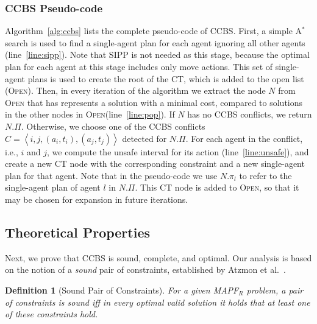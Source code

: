 \documentclass[review]{elsarticle}
\newtheorem{definition}{Definition}
\newcommand{\tuple}[1]{\ensuremath{\left \langle #1 \right \rangle }}
\newcommand\konstantin[1]{\nb{\textbf{Konstantin:}}{red}{#1}}
\newcommand\roni[1]{\nb{\textbf{Roni:}}{green}{#1}}
\newcommand\dor[1]{\nb{\textbf{Dor:}}{Fuchsia}{#1}}
\newcommand{\ccbs}{\ac{CCBS}\xspace}
\newcommand{\ct}{\ac{CT}\xspace}
\newcommand{\sipp}{\ac{SIPP}\xspace}
\newcommand{\astar}{A$^*$\xspace}
\newcommand{\mapfr}{\ac{MAPF}$_R$\xspace}
\newcommand{\OPEN}{\textsc{Open}\xspace}
\newcommand{\shortcite}{\cite}
\begin{document}
\subsubsection{\ccbs Pseudo-code}
Algorithm~\ref{alg:ccbs} lists the complete pseudo-code of \ccbs. First, a simple \astar search is used to find a single-agent plan for each agent ignoring all other agents (line~\ref{line:sipp}). Note that \sipp is not needed as this stage, because the optimal plan for each agent at this stage includes only move actions. %
This set of single-agent plans is used to create the root of the \ct, which is added to the open list (\OPEN). 
Then, in every iteration of the algorithm we extract the node $N$ from \OPEN that has represents a solution with a minimal cost, compared to solutions in the other nodes in \OPEN (line~\ref{line:pop}). 
If $N$ has no \ccbs conflicts, we return $N.\Pi$. 
Otherwise, we choose one of the \ccbs conflicts $C=\tuple{i,j, (a_i,t_i), (a_j,t_j)}$ detected for $N.\Pi$. 
For each agent in the conflict, i.e., $i$ and $j$, we compute the unsafe interval for its action (line~\ref{line:unsafe}), and create a new \ct node with the corresponding constraint and a new single-agent plan for that agent. 
Note that in the pseudo-code we use $N.\pi_l$ to refer to the single-agent plan of agent $l$ in $N.\Pi$. This \ct node is added to \OPEN, so that it may be chosen for expansion in future iterations. 


\subsection{Theoretical Properties}



Next, we prove that \ccbs is sound, complete, and optimal. Our analysis is based on the notion of a \emph{sound} pair of constraints, established by Atzmon et al.~\shortcite{atzmon2018robust}. 

\begin{definition}[Sound Pair of Constraints]
For a given \mapfr problem, a pair of constraints is sound iff in every optimal valid solution it holds that at least one of these constraints hold. 
\label{def:sound}
\end{definition}
\end{document}
